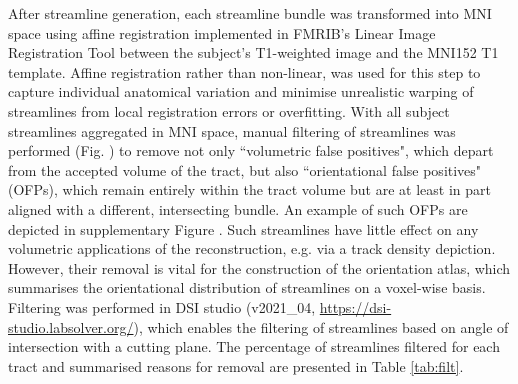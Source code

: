 After streamline generation, each streamline bundle was transformed into MNI space using affine registration implemented in FMRIB's Linear Image Registration Tool\autocite{Jenkinson2002} between the subject's T1-weighted image and the MNI152 T1 template.\autocite{Fonov2011}
Affine registration rather than non-linear, was used for this step to capture individual anatomical variation and minimise unrealistic warping of streamlines from local registration errors or overfitting.
With all subject streamlines aggregated in MNI space, manual filtering of streamlines was performed (Fig. ) to remove not only ``volumetric false positives", which depart from the accepted volume of the tract, but also ``orientational false positives" (OFPs), which remain entirely within the tract volume but are at least in part aligned with a different, intersecting bundle.
An example of such OFPs are depicted in supplementary Figure . Such streamlines have little effect on any volumetric applications of the reconstruction, e.g. via a track density depiction.
However, their removal is vital for the construction of the orientation atlas, which summarises the orientational distribution of streamlines on a voxel-wise basis.
Filtering was performed in DSI studio (v2021\_04, \url{https://dsi-studio.labsolver.org/})\autocite{Yeh2021a}, which enables the filtering of streamlines based on angle of intersection with a cutting plane.
The percentage of streamlines filtered for each tract and summarised reasons for removal are presented in Table \ref{tab:filt}.

